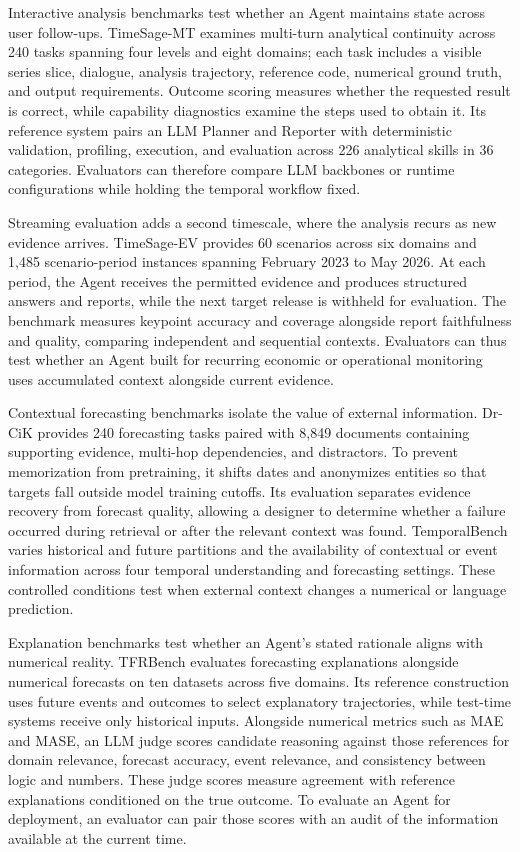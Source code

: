 \documentclass[preprints,article,submit,moreauthors]{Definitions/mdpi}
\begin{document}
Interactive analysis benchmarks test whether an Agent maintains state across user follow-ups. TimeSage-MT \citep{timesagemt2026} examines multi-turn analytical continuity across 240 tasks spanning four levels and eight domains; each task includes a visible series slice, dialogue, analysis trajectory, reference code, numerical ground truth, and output requirements. Outcome scoring measures whether the requested result is correct, while capability diagnostics examine the steps used to obtain it. Its reference system pairs an LLM Planner and Reporter with deterministic validation, profiling, execution, and evaluation across 226 analytical skills in 36 categories. Evaluators can therefore compare LLM backbones or runtime configurations while holding the temporal workflow fixed.

Streaming evaluation adds a second timescale, where the analysis recurs as new evidence arrives. TimeSage-EV \citep{timesageev2026} provides 60 scenarios across six domains and 1,485 scenario-period instances spanning February 2023 to May 2026. At each period, the Agent receives the permitted evidence and produces structured answers and reports, while the next target release is withheld for evaluation. The benchmark measures keypoint accuracy and coverage alongside report faithfulness and quality, comparing independent and sequential contexts. Evaluators can thus test whether an Agent built for recurring economic or operational monitoring uses accumulated context alongside current evidence.

Contextual forecasting benchmarks isolate the value of external information. Dr-CiK \citep{drcik2026} provides 240 forecasting tasks paired with 8,849 documents containing supporting evidence, multi-hop dependencies, and distractors. To prevent memorization from pretraining, it shifts dates and anonymizes entities so that targets fall outside model training cutoffs. Its evaluation separates evidence recovery from forecast quality, allowing a designer to determine whether a failure occurred during retrieval or after the relevant context was found. TemporalBench \citep{temporalbench2026} varies historical and future partitions and the availability of contextual or event information across four temporal understanding and forecasting settings. These controlled conditions test when external context changes a numerical or language prediction.

Explanation benchmarks test whether an Agent's stated rationale aligns with numerical reality. TFRBench \citep{tfrbench2026} evaluates forecasting explanations alongside numerical forecasts on ten datasets across five domains. Its reference construction uses future events and outcomes to select explanatory trajectories, while test-time systems receive only historical inputs. Alongside numerical metrics such as MAE and MASE, an LLM judge scores candidate reasoning against those references for domain relevance, forecast accuracy, event relevance, and consistency between logic and numbers. These judge scores measure agreement with reference explanations conditioned on the true outcome. To evaluate an Agent for deployment, an evaluator can pair those scores with an audit of the information available at the current time.
\end{document}
